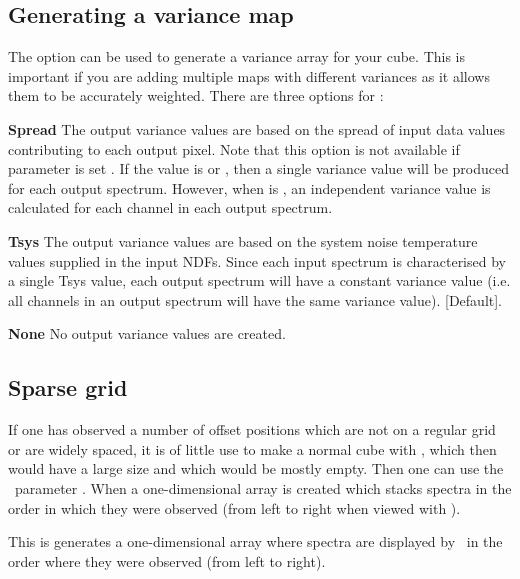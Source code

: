 \documentclass[11pt,oneside,chapters]{starlink}
\begin{document}
\subsection{Generating a variance map}

The option  can be used to generate a variance array for
your cube. This is important if you are adding multiple maps with
different variances as it allows them to be accurately weighted. There
are three options for :

\begin{center}
\begin{aligndesc}
\item[\textbf{Spread }]
The output variance values are based on the spread of input data
values contributing to each output pixel. Note that this option is not
available if parameter  is set . If the
 value is  or , then a single
variance value will be produced for each output spectrum. However,
when  is , an independent variance value is
calculated for each channel in each output spectrum.
\vspace{0.7cm}\\
\item[\textbf{Tsys }]
The output variance values are based on the system noise temperature
values supplied in the input NDFs. Since each input spectrum is
characterised by a single Tsys value, each output spectrum will have a
constant variance value (i.e. all channels in an output spectrum will
have the same variance value). [Default].
\vspace{0.7cm}\\
\item[\textbf{None }]
 No output variance values are created.\\
\end{aligndesc}
\end{center}

\subsection{Sparse grid}

If one has observed a number of offset positions which are not on a
regular grid or are widely spaced, it is of little use to make a
normal cube with \makecube, which then would have a large size and
which would be mostly empty. Then one can use the \makecube\ parameter
. When  a one-dimensional array is
created which stacks spectra in the order in which they were observed
(from left to right when viewed with \gaia).
\begin{terminalv}
\end{terminalv}
This is generates a one-dimensional array where spectra are displayed by
\gaia\ in the order where they were observed (from left to right).
\end{document}
